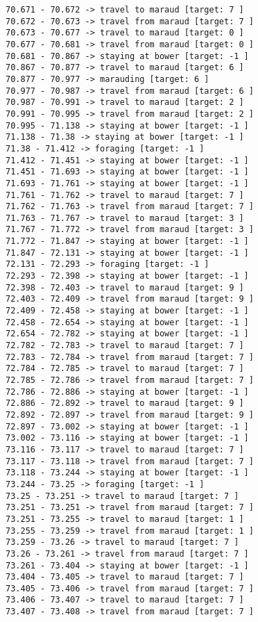 \documentclass[11pt]{article}
\begin{document}
\begin{Verbatim}[commandchars=\\\{\}]
70.671 - 70.672 -> travel to maraud [target: 7 ]
70.672 - 70.673 -> travel from maraud [target: 7 ]
70.673 - 70.677 -> travel to maraud [target: 0 ]
70.677 - 70.681 -> travel from maraud [target: 0 ]
70.681 - 70.867 -> staying at bower [target: -1 ]
70.867 - 70.877 -> travel to maraud [target: 6 ]
70.877 - 70.977 -> marauding [target: 6 ]
70.977 - 70.987 -> travel from maraud [target: 6 ]
70.987 - 70.991 -> travel to maraud [target: 2 ]
70.991 - 70.995 -> travel from maraud [target: 2 ]
70.995 - 71.138 -> staying at bower [target: -1 ]
71.138 - 71.38 -> staying at bower [target: -1 ]
71.38 - 71.412 -> foraging [target: -1 ]
71.412 - 71.451 -> staying at bower [target: -1 ]
71.451 - 71.693 -> staying at bower [target: -1 ]
71.693 - 71.761 -> staying at bower [target: -1 ]
71.761 - 71.762 -> travel to maraud [target: 7 ]
71.762 - 71.763 -> travel from maraud [target: 7 ]
71.763 - 71.767 -> travel to maraud [target: 3 ]
71.767 - 71.772 -> travel from maraud [target: 3 ]
71.772 - 71.847 -> staying at bower [target: -1 ]
71.847 - 72.131 -> staying at bower [target: -1 ]
72.131 - 72.293 -> foraging [target: -1 ]
72.293 - 72.398 -> staying at bower [target: -1 ]
72.398 - 72.403 -> travel to maraud [target: 9 ]
72.403 - 72.409 -> travel from maraud [target: 9 ]
72.409 - 72.458 -> staying at bower [target: -1 ]
72.458 - 72.654 -> staying at bower [target: -1 ]
72.654 - 72.782 -> staying at bower [target: -1 ]
72.782 - 72.783 -> travel to maraud [target: 7 ]
72.783 - 72.784 -> travel from maraud [target: 7 ]
72.784 - 72.785 -> travel to maraud [target: 7 ]
72.785 - 72.786 -> travel from maraud [target: 7 ]
72.786 - 72.886 -> staying at bower [target: -1 ]
72.886 - 72.892 -> travel to maraud [target: 9 ]
72.892 - 72.897 -> travel from maraud [target: 9 ]
72.897 - 73.002 -> staying at bower [target: -1 ]
73.002 - 73.116 -> staying at bower [target: -1 ]
73.116 - 73.117 -> travel to maraud [target: 7 ]
73.117 - 73.118 -> travel from maraud [target: 7 ]
73.118 - 73.244 -> staying at bower [target: -1 ]
73.244 - 73.25 -> foraging [target: -1 ]
73.25 - 73.251 -> travel to maraud [target: 7 ]
73.251 - 73.251 -> travel from maraud [target: 7 ]
73.251 - 73.255 -> travel to maraud [target: 1 ]
73.255 - 73.259 -> travel from maraud [target: 1 ]
73.259 - 73.26 -> travel to maraud [target: 7 ]
73.26 - 73.261 -> travel from maraud [target: 7 ]
73.261 - 73.404 -> staying at bower [target: -1 ]
73.404 - 73.405 -> travel to maraud [target: 7 ]
73.405 - 73.406 -> travel from maraud [target: 7 ]
73.406 - 73.407 -> travel to maraud [target: 7 ]
73.407 - 73.408 -> travel from maraud [target: 7 ]

\end{Verbatim}
\end{document}

